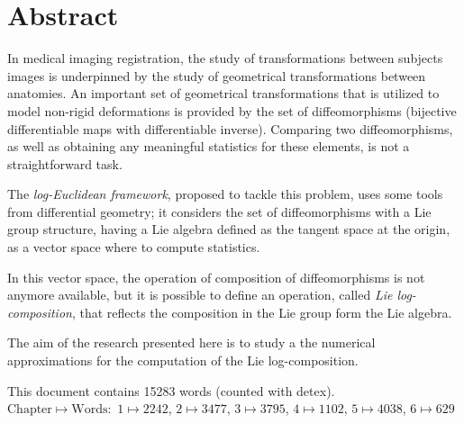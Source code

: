 
\qquad
\pagestyle{empty}
\newpage



\section*{Abstract}


In medical imaging registration, the study of transformations between subjects images is underpinned by the study of geometrical transformations between anatomies. An important set of geometrical transformations that is utilized to model non-rigid deformations is provided by the set of diffeomorphisms (bijective differentiable maps with differentiable inverse).
Comparing two diffeomorphisms, as well as obtaining any meaningful statistics for these elements, is not a straightforward task.

The \emph{log-Euclidean framework}, proposed to tackle this problem, uses some tools from differential geometry; it considers the set of diffeomorphisms with a Lie group structure, having a Lie algebra defined as the tangent space at the origin, as a vector space where to compute statistics.

In this vector space, the operation of composition of diffeomorphisms is not anymore available, but it is possible to define an operation, called \emph{Lie log-composition}, that reflects the composition in the Lie group form the Lie algebra.

The aim of the research presented here is to study a the numerical approximations for the computation of the Lie log-composition. 


\vspace{1cm}

\noindent
This document contains 15283 words (counted with detex).\\
$ \text{Chapter} \mapsto \text{Words}:$ 
$1 \mapsto 2242$,
$2 \mapsto 3477 $,
$3 \mapsto 3795 $,
$4 \mapsto 1102 $,
$5 \mapsto 4038$,
$6 \mapsto 629$

\qquad
\pagestyle{empty}
\newpage


